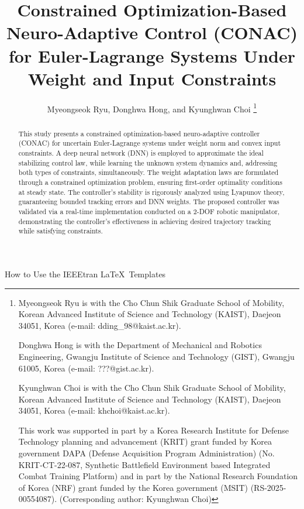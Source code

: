 \documentclass[lettersize,journal]{IEEEtran}
\begin{document}
\title{
    Constrained Optimization-Based Neuro-Adaptive Control (CONAC) for Euler-Lagrange Systems Under Weight and Input Constraints
} %

\author{
  Myeongseok Ryu, Donghwa Hong, and Kyunghwan Choi
\thanks{
    Myeongseok Ryu is with the Cho Chun Shik Graduate School of Mobility, Korean Advanced Institute of Science and Technology (KAIST), Daejeon 34051, Korea (e-mail: dding\_98@kaist.ac.kr).

    Donghwa Hong is with the Department of Mechanical and Robotics Engineering, Gwangju Institute of Science and Technology (GIST), Gwangju 61005, Korea (e-mail: ???@gist.ac.kr).

    Kyunghwan Choi is with the Cho Chun Shik Graduate School of Mobility, Korean Advanced Institute of Science and Technology (KAIST), Daejeon 34051, Korea (e-mail: khchoi@kaist.ac.kr).
    
    This work was supported in part by a Korea Research Institute for Defense Technology planning and advancement (KRIT) grant funded by Korea government DAPA (Defense Acquisition Program Administration) (No. KRIT-CT-22-087, Synthetic Battlefield Environment based Integrated Combat Training Platform) and in part by the National Research Foundation of Korea (NRF) grant funded by the Korea government (MSIT) (RS-2025- 00554087). (Corresponding author: Kyunghwan Choi)
    }}

%
{How to Use the IEEEtran \LaTeX \ Templates}

\maketitle

\begin{abstract}
  This study presents a constrained optimization-based neuro-adaptive controller (CONAC) for uncertain Euler-Lagrange systems under weight norm and convex input constraints. 
  A deep neural network (DNN) is employed to approximate the ideal stabilizing control law, while learning the unknown system dynamics and,  addressing both types of constraints, simultaneously.
  The weight adaptation laws are formulated through a constrained optimization problem, ensuring first-order optimality conditions at steady state. 
  The controller's stability is rigorously analyzed using Lyapunov theory, guaranteeing bounded tracking errors and DNN weights. 
  The proposed controller was validated via a real-time implementation conducted on a 2-DOF robotic manipulator, demonstrating the controller's effectiveness in achieving desired trajectory tracking while satisfying constraints.
\end{abstract}
\end{document}
